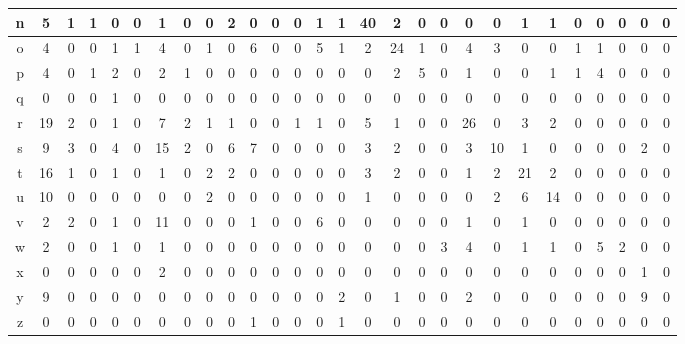 {\begin{table*}[]
\begin{center}
\begin{tabular}{|c|c|c|c|c|c|c|c|c|c|c|c|c|c|c|c|c|c|c|c|c|c|c|c|c|c|c|c|}
n & 5 & 1 & 1 & 0 & 0 & 1 & 0 & 0 & 2 & 0 & 0 & 0 & 1 & 1 & 40 & 2 & 0 & 0 & 0 & 0 & 1 & 1 & 0 & 0 & 0 & 0 & 0 \\ \hline
o & 4 & 0 & 0 & 1 & 1 & 4 & 0 & 1 & 0 & 6 & 0 & 0 & 5 & 1 & 2 & 24 & 1 & 0 & 4 & 3 & 0 & 0 & 1 & 1 & 0 & 0 & 0 \\ \hline
p & 4 & 0 & 1 & 2 & 0 & 2 & 1 & 0 & 0 & 0 & 0 & 0 & 0 & 0 & 0 & 2 & 5 & 0 & 1 & 0 & 0 & 1 & 1 & 4 & 0 & 0 & 0 \\ \hline
q & 0 & 0 & 0 & 1 & 0 & 0 & 0 & 0 & 0 & 0 & 0 & 0 & 0 & 0 & 0 & 0 & 0 & 0 & 0 & 0 & 0 & 0 & 0 & 0 & 0 & 0 & 0 \\ \hline
r & 19 & 2 & 0 & 1 & 0 & 7 & 2 & 1 & 1 & 0 & 0 & 1 & 1 & 0 & 5 & 1 & 0 & 0 & 26 & 0 & 3 & 2 & 0 & 0 & 0 & 0 & 0 \\ \hline
s & 9 & 3 & 0 & 4 & 0 & 15 & 2 & 0 & 6 & 7 & 0 & 0 & 0 & 0 & 3 & 2 & 0 & 0 & 3 & 10 & 1 & 0 & 0 & 0 & 0 & 2 & 0 \\ \hline
t & 16 & 1 & 0 & 1 & 0 & 1 & 0 & 2 & 2 & 0 & 0 & 0 & 0 & 0 & 3 & 2 & 0 & 0 & 1 & 2 & 21 & 2 & 0 & 0 & 0 & 0 & 0 \\ \hline
u & 10 & 0 & 0 & 0 & 0 & 0 & 0 & 2 & 0 & 0 & 0 & 0 & 0 & 0 & 1 & 0 & 0 & 0 & 0 & 2 & 6 & 14 & 0 & 0 & 0 & 0 & 0 \\ \hline
v & 2 & 2 & 0 & 1 & 0 & 11 & 0 & 0 & 0 & 1 & 0 & 0 & 6 & 0 & 0 & 0 & 0 & 0 & 1 & 0 & 1 & 0 & 0 & 0 & 0 & 0 & 0 \\ \hline
w & 2 & 0 & 0 & 1 & 0 & 1 & 0 & 0 & 0 & 0 & 0 & 0 & 0 & 0 & 0 & 0 & 0 & 3 & 4 & 0 & 1 & 1 & 0 & 5 & 2 & 0 & 0 \\ \hline
x & 0 & 0 & 0 & 0 & 0 & 2 & 0 & 0 & 0 & 0 & 0 & 0 & 0 & 0 & 0 & 0 & 0 & 0 & 0 & 0 & 0 & 0 & 0 & 0 & 0 & 1 & 0 \\ \hline
y & 9 & 0 & 0 & 0 & 0 & 0 & 0 & 0 & 0 & 0 & 0 & 0 & 0 & 2 & 0 & 1 & 0 & 0 & 2 & 0 & 0 & 0 & 0 & 0 & 0 & 9 & 0 \\ \hline
z & 0 & 0 & 0 & 0 & 0 & 0 & 0 & 0 & 0 & 1 & 0 & 0 & 0 & 1 & 0 & 0 & 0 & 0 & 0 & 0 & 0 & 0 & 0 & 0 & 0 & 0 & 0 \\ \hline
   \end{tabular}
  \end{center}
 \end{table*}
}

